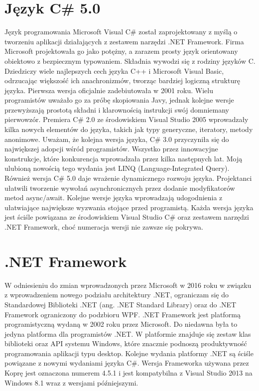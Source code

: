 \documentclass[a4paper,twoside,titlepage,openright]{book}
\begin{document}
\section{Język C\# 5.0}
Język programowania Microsoft Visual C\# został zaprojektowany z myślą o tworzeniu aplikacji działających z zestawem narzędzi .NET Framework. Firma Microsoft projektowała go jako potężny, a zarazem prosty język orientowany obiektowo z bezpiecznym typowaniem. \cite{csharp} Składnia wywodzi się z rodziny języków C. Dziedziczy wiele najlepszych cech języka C++ i Microsoft Visual Basic, odrzucając większość ich anachronizmów, tworząc bardziej logiczną strukturę języka. Pierwsza wersja oficjalnie zadebiutowała w 2001 roku. Wielu programistów uważało go za próbę skopiowania Javy, jednak kolejne wersje przewyższają prostotą składni i klarownością instrukcji swój domniemany pierwowzór. Premiera C\# 2.0 ze środowiskiem Visual Studio 2005 wprowadzały kilka nowych elementów do języka, takich jak typy generyczne, iteratory, metody anonimowe. Uważam, że kolejna wersja języka, C\# 3.0 przyczyniła się do największej adopcji wśród programistów. Wszystko przez innowacyjne konstrukcje, które konkurencja wprowadzała przez kilka następnych lat. Moją ulubioną nowością tego wydania jest LINQ (Language-Integrated Query). Również wersja C\# 5.0 daje wrażenie dynamicznego rozwoju języka. Projektanci ułatwili tworzenie wywołań asynchronicznych przez dodanie modyfikatorów metod async/await. Kolejne wersje języka wprowadzają udogodnienia z ułatwiające największe wyzwania stojące przed programistą. Każda wersja języka jest ściśle powiązana ze środowiskiem Visual Studio C\# oraz zestawem narzędzi .NET Framework, choć numeracja wersji nie zawsze się pokrywa.

\section{.NET Framework}
W odniesieniu do zmian wprowadzonych przez Microsoft w 2016 roku w związku z wprowadzeniem nowego podziału architektury .NET, ograniczam się do Standardowej Biblioteki .NET (ang. .NET Standard Library) oraz do .NET Framework ograniczony do podzbioru WPF.\cite{dotnetArtykul} 
.NET Framework jest platformą programistyczną wydaną w 2002 roku przez Microsoft. Do niedawna była to jedyna platforma dla programistów .NET. W platformie znajduje się zestaw klas biblioteki oraz API systemu Windows, które znacznie podnoszą produktywność programowania aplikacji typu desktop. Kolejne wydania platformy .NET są ściśle powiązane z nowymi wydaniami języka C\#. Wersja Frameworka używana przez Koprę jest oznaczona numerem 4.5.1  i jest kompatybilna z Visual Studio 2013 na Windows 8.1 wraz z wersjami późniejszymi. 
\end{document}
